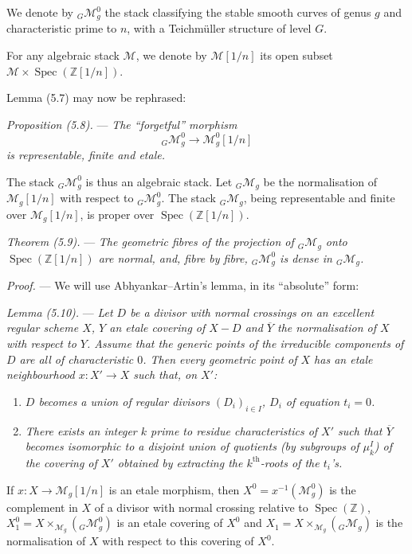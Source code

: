 \documentclass[10pt]{article}
\newcommand{\Spec}{\operatorname{Spec}}
\begin{document}
We denote by ${}_G\mathcal M_g^0$ the stack classifying the stable smooth curves of genus $g$ and characteristic prime to $n$, with a Teichmüller structure of level $G$.

For any algebraic stack $\mathscr M$, we denote by $\mathscr M[1/n]$ its open subset $\mathscr M\times\Spec(\mathbb Z[1/n])$.

Lemma (5.7) may now be rephrased:

\medskip
\noindent\emph{Proposition (5.8).} --- \emph{The ``forgetful'' morphism}
\[
{}_G\mathcal M_g^0\longrightarrow \mathcal M_g^0[1/n]
\]
\emph{is representable, finite and etale.}

The stack ${}_G\mathcal M_g^0$ is thus an algebraic stack. Let ${}_G\mathcal M_g$ be the normalisation of $\mathcal M_g[1/n]$ with respect to ${}_G\mathcal M_g^0$. The stack ${}_G\mathcal M_g$, being representable and finite over $\mathcal M_g[1/n]$, is proper over $\Spec(\mathbb Z[1/n])$.

\medskip
\noindent\emph{Theorem (5.9).} --- \emph{The geometric fibres of the projection of ${}_G\mathcal M_g$ onto $\Spec(\mathbb Z[1/n])$ are normal, and, fibre by fibre, ${}_G\mathcal M_g^0$ is dense in ${}_G\mathcal M_g$.}

\noindent\emph{Proof.} --- We will use Abhyankar--Artin's lemma, in its ``absolute'' form:

\medskip
\noindent\emph{Lemma (5.10).} --- \emph{Let $D$ be a divisor with normal crossings on an excellent regular scheme $X$, $Y$ an etale covering of $X-D$ and $\overline Y$ the normalisation of $X$ with respect to $Y$. Assume that the generic points of the irreducible components of $D$ are all of characteristic $0$. Then every geometric point of $X$ has an etale neighbourhood $x:X'\to X$ such that, on $X'$:}
\begin{enumerate}[label=(\roman*)]
\item \emph{$D$ becomes a union of regular divisors $(D_i)_{i\in I}$, $D_i$ of equation $t_i=0$.}
\item \emph{There exists an integer $k$ prime to residue characteristics of $X'$ such that $\overline Y$ becomes isomorphic to a disjoint union of quotients (by subgroups of $\mu_k^I$) of the covering of $X'$ obtained by extracting the $k^{\mathrm{th}}$-roots of the $t_i$'s.}
\end{enumerate}

If $x:X\to\mathcal M_g[1/n]$ is an etale morphism, then $X^0=x^{-1}(\mathcal M_g^0)$ is the complement in $X$ of a divisor with normal crossing relative to $\Spec(\mathbb Z)$, $X_1^0=X\times_{\mathcal M_g}({}_G\mathcal M_g^0)$ is an etale covering of $X^0$ and $X_1=X\times_{\mathcal M_g}({}_G\mathcal M_g)$ is the normalisation of $X$ with respect to this covering of $X^0$.
\end{document}
